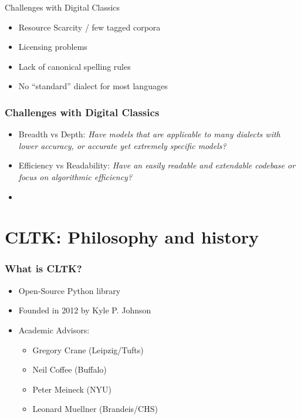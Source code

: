 \documentclass{beamer}
\begin{document}
\begin{frame}{Challenges with Digital Classics}

\begin{itemize}
    \item Resource Scarcity / few tagged corpora
    \item Licensing problems
    \item Lack of canonical spelling rules
    \item No “standard” dialect for most languages
\end{itemize}{}
    
\end{frame}{}



\begin{frame}
\frametitle{Challenges with Digital Classics}
\begin{itemize}
    \item Breadth vs Depth: \textit{Have models that are applicable to many dialects with lower accuracy, or accurate yet extremely   specific models?}

    \item Efficiency vs Readability: \textit{Have an easily readable and extendable codebase or focus on algorithmic efficiency?}
    \item 
\end{itemize}
\end{frame}


\section{CLTK: Philosophy and history}


\begin{frame}
\frametitle{What is CLTK?}
\begin{itemize}
    \item Open-Source Python library
    \item Founded in 2012 by Kyle P. Johnson
    \item Academic Advisors:
    \begin{itemize}
    \item Gregory Crane (Leipzig/Tufts)
    \item Neil Coffee (Buffalo)
    \item Peter Meineck (NYU)
    \item Leonard Muellner (Brandeis/CHS)
    \end{itemize}
\end{itemize}
\end{frame}
\end{document}
